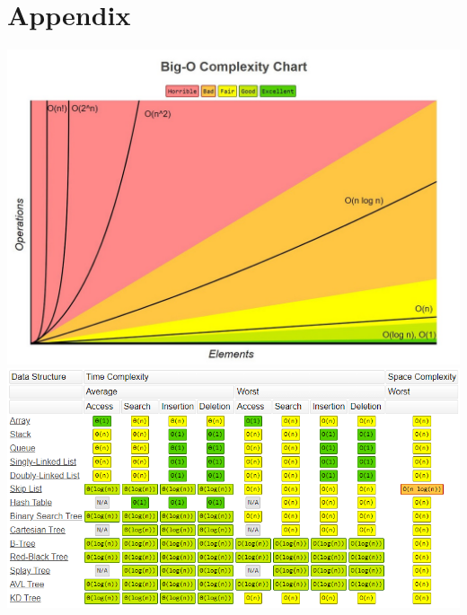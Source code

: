 \documentclass{article}
\begin{document}
    \section{Appendix}
    \renewcommand\labelitemi{{\boldmath$\cdot$}}
    \includegraphics[width=\linewidth]{big_o_complexity_chart}
    \includegraphics[width=\linewidth]{data_structures_big_o}
\end{document}
